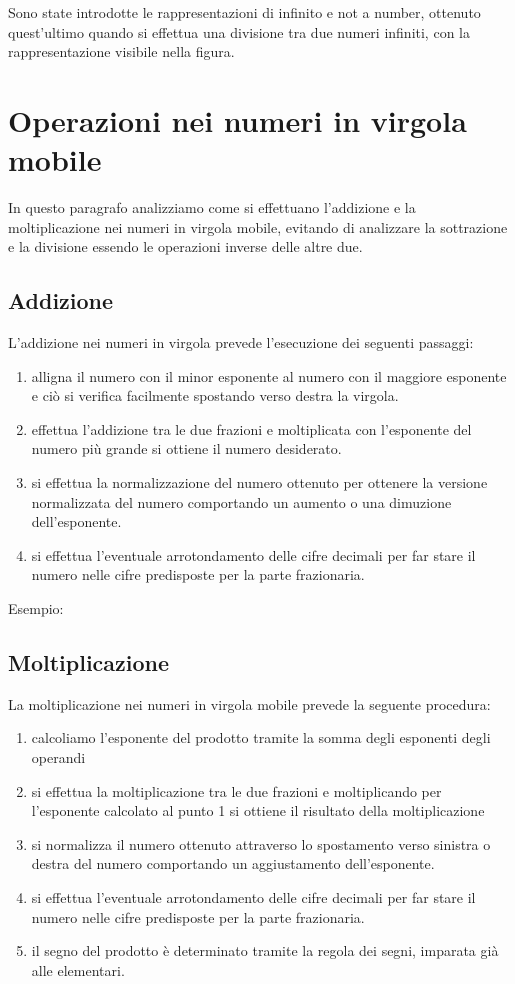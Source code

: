 Sono state introdotte le rappresentazioni di infinito e not a number, ottenuto quest'ultimo
quando si effettua una divisione tra due numeri infiniti, con la rappresentazione visibile
nella figura.

\section{Operazioni nei numeri in virgola mobile}
In questo paragrafo analizziamo come si effettuano l'addizione e la moltiplicazione
nei numeri in virgola mobile, evitando di analizzare la sottrazione e la divisione
essendo le operazioni inverse delle altre due.

\subsection{Addizione}
L'addizione nei numeri in virgola prevede l'esecuzione dei seguenti passaggi:
\begin{enumerate}
  \item alligna il numero con il minor esponente al numero con il maggiore esponente
        e ciò si verifica facilmente spostando verso destra la virgola.
  \item effettua l'addizione tra le due frazioni e moltiplicata con l'esponente del numero
        più grande si ottiene il numero desiderato.
  \item si effettua la normalizzazione del numero ottenuto per ottenere la versione
        normalizzata del numero comportando un aumento o una dimuzione dell'esponente.
  \item si effettua l'eventuale arrotondamento delle cifre decimali per far stare
        il numero nelle cifre predisposte per la parte frazionaria.
\end{enumerate}

Esempio:


\subsection{Moltiplicazione}
La moltiplicazione nei numeri in virgola mobile prevede la seguente procedura:
\begin{enumerate}
  \item calcoliamo l'esponente del prodotto tramite la somma degli esponenti degli operandi
  \item si effettua la moltiplicazione tra le due frazioni e moltiplicando per l'esponente
        calcolato al punto 1 si ottiene il risultato della moltiplicazione
  \item si normalizza il numero ottenuto attraverso lo spostamento verso sinistra o destra
        del numero comportando un aggiustamento dell'esponente.
  \item si effettua l'eventuale arrotondamento delle cifre decimali per far stare
        il numero nelle cifre predisposte per la parte frazionaria.
  \item il segno del prodotto è determinato tramite la regola dei segni, imparata già alle elementari.
\end{enumerate}

